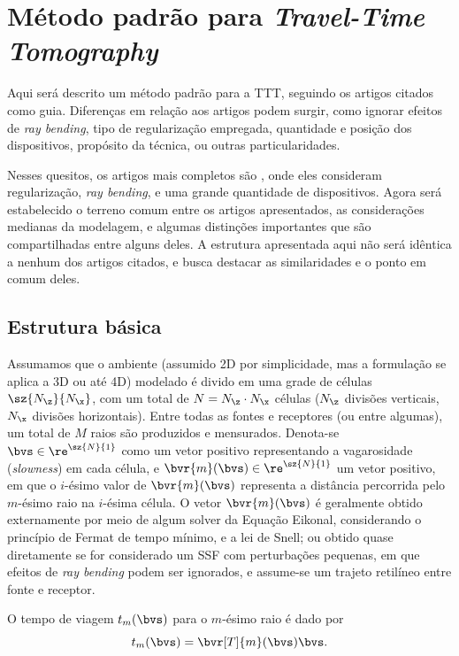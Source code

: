 \section{Método padrão para \textsl{Travel-Time Tomography}}
\label{app:modelo-padrão-TTT}

Aqui será descrito um método padrão para a TTT, seguindo os artigos citados como guia. Diferenças em relação aos artigos podem surgir, como ignorar efeitos de \textsl{ray bending}, tipo de regularização empregada, quantidade e posição dos dispositivos, propósito da técnica, ou outras particularidades.

Nesses quesitos, os artigos mais completos são \cite{ali_opensource_2019,phillips_traveltime_1991,hormati_robust_2010}, onde eles consideram regularização, \textsl{ray bending}, e uma grande quantidade de dispositivos. Agora será estabelecido o terreno comum entre os artigos apresentados, as considerações medianas da modelagem, e algumas distinções importantes que são compartilhadas entre alguns deles. A estrutura apresentada aqui não será idêntica a nenhum dos artigos citados, e busca destacar as similaridades e o ponto em comum deles.

\subsection{Estrutura básica}
Assumamos que o ambiente (assumido 2D por simplicidade, mas a formulação se aplica a 3D ou até 4D) modelado é divido em uma grade de células $\sz{N_{\z}}{N_{\x}}$, com um total de $N = N_{\z} \cdot N_{\x}$ células ($N_{\z}$ divisões verticais, $N_{\x}$ divisões horizontais). Entre todas as fontes e receptores (ou entre algumas), um total de $M$ raios são produzidos e mensurados. Denota-se $\bvs \in \re^{\sz{N}{1}}$ como um vetor positivo representando a vagarosidade (\textsl{slowness}) em cada célula, e $\bvr{m}(\bvs) \in \re^{\sz{N}{1}}$ um vetor positivo, em que o $i$-ésimo valor de $\bvr{m}(\bvs)$ representa a distância percorrida pelo $m$-ésimo raio na $i$-ésima célula. O vetor $\bvr{m}(\bvs)$ é geralmente obtido externamente por meio de algum solver da Equação Eikonal, considerando o princípio de Fermat de tempo mínimo, e a lei de Snell; ou obtido quase diretamente se for considerado um SSF com perturbações pequenas, em que efeitos de \textsl{ray bending} podem ser ignorados, e assume-se um trajeto retilíneo entre fonte e receptor.

O tempo de viagem  $t_m(\bvs)$ para o $m$-ésimo raio é dado por
\begin{equation}
	t_m(\bvs) = \bvr[T]{m}(\bvs) \bvs.
\end{equation}

